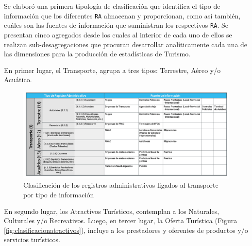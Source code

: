 \documentclass[
]{book}
\begin{document}
Se elaboró una primera tipología de clasificación que identifica el tipo de información que los diferentes \texttt{RA} almacenan y proporcionan, como así también, cuáles son las fuentes de información que suministran los respectivos \texttt{RA}. Se presentan cinco agregados desde los cuales al interior de cada uno de ellos se realizan sub-desagregaciones que procuran desarrollar analíticamente cada una de las dimensiones para la producción de estadísticas de Turismo.

En primer lugar, el Transporte, agrupa a tres tipos: Terrestre, Aéreo y/o Acuático.

\begin{figure}

{\centering \includegraphics[width=1\linewidth]{imagenes/figura03A} 

}

\caption{Clasificación de los registros administrativos ligados al transporte por tipo de información}\label{fig:clasificaciontransporte}
\end{figure}

En segundo lugar, los Atractivos Turísticos, contemplan a los Naturales, Culturales y/o Recreativos. Luego, en tercer lugar, la Oferta Turística (Figura \ref{fig:clasificacionatractivos}), incluye a los prestadores y oferentes de productos y/o servicios turísticos.
\end{document}
